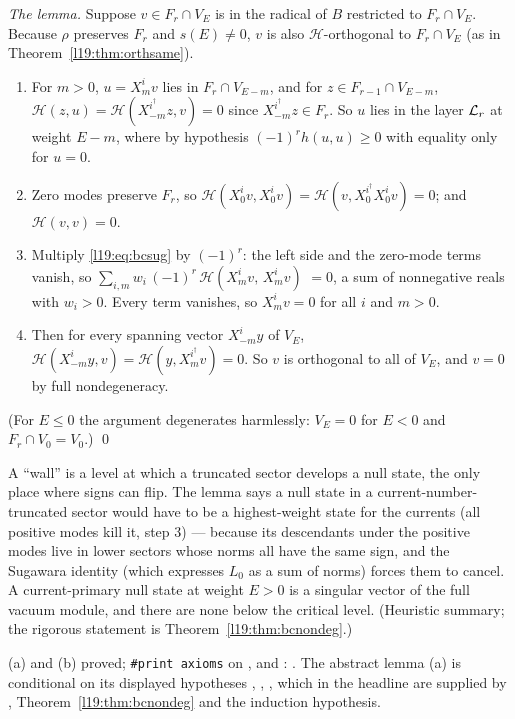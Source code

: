 \emph{The lemma.} Suppose $v\in F_r\cap V_E$ is in the radical of $B$ restricted to $F_r\cap V_E$. Because
$\rho$ preserves $F_r$ and $s(E)\ne0$, $v$ is also $\mathcal H$-orthogonal to $F_r\cap V_E$ (as in Theorem~\ref{l19:thm:orthsame}).
\begin{enumerate}
\item For $m>0$, $u = X^i_mv$ lies in $F_r\cap V_{E-m}$, and for $z\in F_{r-1}\cap V_{E-m}$,
  $\mathcal H(z,u) = \mathcal H(X^{i^\dagger}_{-m}z,v) = 0$ since $X^{i^\dagger}_{-m}z\in F_r$. So $u$ lies in the layer $\mathcal{L}_r$ at
  weight $E-m$, where by hypothesis $(-1)^rh(u,u)\ge0$ with equality only for $u = 0$.
\item Zero modes preserve $F_r$, so $\mathcal H(X^i_0v,X^i_0v) = \mathcal H(v,X^{i^\dagger}_0X^i_0v) = 0$; and $\mathcal H(v,v) = 0$.
\item Multiply \eqref{l19:eq:bcsug} by $(-1)^r$: the left side and the zero-mode terms vanish, so
  $\sum_{i,m}w_i\,(-1)^r\,\mathcal H(X^i_mv,\,X^i_mv)$ $= 0$, a sum of nonnegative reals with $w_i>0$. Every term vanishes, so
  $X^i_mv = 0$ for all $i$ and $m>0$.
\item Then for every spanning vector $X^i_{-m}y$ of $V_E$, $\mathcal H(X^i_{-m}y,v) = \mathcal H(y,X^{i^\dagger}_mv) = 0$. So $v$ is
  orthogonal to all of $V_E$, and $v = 0$ by full nondegeneracy.
\end{enumerate}
(For $E\le0$ the argument degenerates harmlessly: $V_E = 0$ for $E<0$ and $F_r\cap V_0 = V_0$.) \qed

\begin{physics}
A ``wall'' is a level at which a truncated sector develops a null state, the only place where signs can flip. The lemma
says a null state in a current-number-truncated sector would have to be a highest-weight state for the currents (all
positive modes kill it, step 3) --- because its descendants under the positive modes live in lower sectors whose norms all
have the same sign, and the Sugawara identity (which expresses $L_0$ as a sum of norms) forces them to cancel. A
current-primary null state at weight $E>0$ is a singular vector of the full vacuum module, and there are none below the
critical level. (Heuristic summary; the rigorous statement is Theorem~\ref{l19:thm:bcnondeg}.)
\end{physics}

\begin{status}
(a) and (b) proved; \texttt{\#print axioms} on ,
 and :
. The abstract lemma (a) is conditional on its displayed hypotheses
, , , which in the headline are supplied by ,
Theorem~\ref{l19:thm:bcnondeg} and the induction hypothesis.
\end{status}

